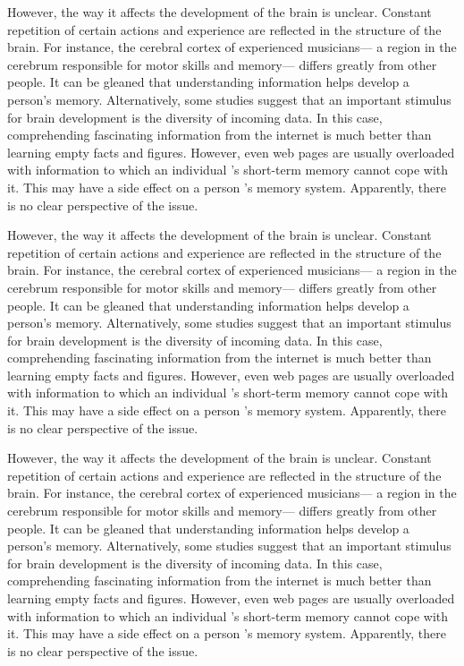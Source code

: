 \documentclass[aps,superscriptaddress,twocolumn,nopreprintnumbers,floatfix,groupedaddress]{revtex4-1}
\begin{document}
However, the way it affects the development of the brain is unclear. Constant repetition of certain actions and experience are reflected in the structure of the brain. For instance, the cerebral cortex of experienced musicians— a region in the cerebrum responsible for motor skills and memory— differs greatly from other people. It can be gleaned that understanding information helps develop a person’s memory. Alternatively, some studies suggest that an important stimulus for brain development is the diversity of incoming data. In this case, comprehending fascinating information from the internet is much better than learning empty facts and figures. However, even web pages are usually overloaded with information to which an individual ’s short-term memory cannot cope with it. This may have a side effect on a person ’s memory system. Apparently, there is no clear perspective of the issue.

However, the way it affects the development of the brain is unclear. Constant repetition of certain actions and experience are reflected in the structure of the brain. For instance, the cerebral cortex of experienced musicians— a region in the cerebrum responsible for motor skills and memory— differs greatly from other people. It can be gleaned that understanding information helps develop a person’s memory. Alternatively, some studies suggest that an important stimulus for brain development is the diversity of incoming data. In this case, comprehending fascinating information from the internet is much better than learning empty facts and figures. However, even web pages are usually overloaded with information to which an individual ’s short-term memory cannot cope with it. This may have a side effect on a person ’s memory system. Apparently, there is no clear perspective of the issue.

However, the way it affects the development of the brain is unclear. Constant repetition of certain actions and experience are reflected in the structure of the brain. For instance, the cerebral cortex of experienced musicians— a region in the cerebrum responsible for motor skills and memory— differs greatly from other people. It can be gleaned that understanding information helps develop a person’s memory. Alternatively, some studies suggest that an important stimulus for brain development is the diversity of incoming data. In this case, comprehending fascinating information from the internet is much better than learning empty facts and figures. However, even web pages are usually overloaded with information to which an individual ’s short-term memory cannot cope with it. This may have a side effect on a person ’s memory system. Apparently, there is no clear perspective of the issue.
\end{document}
